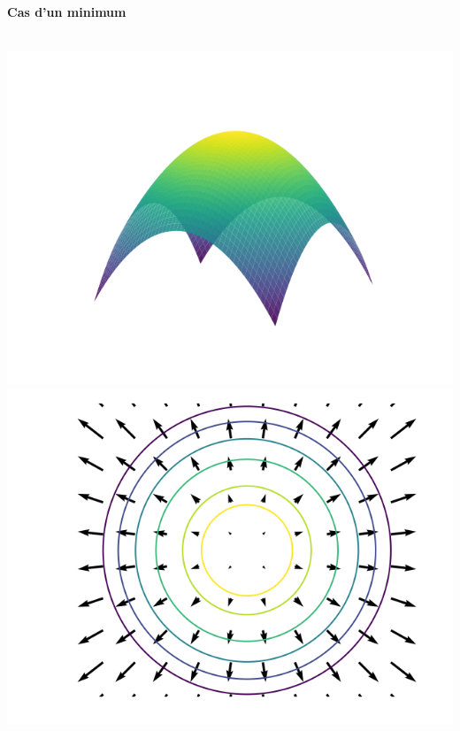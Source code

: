 \begin{center}
\begin{minipage}{0.30\textwidth}
		\quad\textbf{Cas d'un minimum}
	\end{minipage}
	\begin{minipage}{0.30\textwidth}
		\center
		
		\ \ \includegraphics[scale=\myscale,scale=0.35]{figures/gradient-surface-2}\\
		
		\includegraphics[scale=\myscale,scale=0.35]{figures/gradient-surface-5b}
		

\end{minipage}
\end{center}
